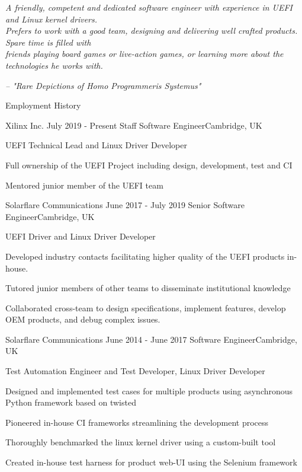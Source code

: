 \documentclass{format/resume} %
\begin{document}
{\it A friendly, competent and dedicated software engineer with experience in UEFI and Linux kernel drivers. \\
Prefers to work with a good team, designing and delivering well crafted products. Spare time is filled with \\
friends playing board games or live-action games, or learning more about the technologies he works with.}
\begin{flushright}
{\it -- "Rare Depictions of Homo Programmeris Systemus"}
\end{flushright}

\begin{rSection}{Employment History}
  \begin{rSubsection}{Xilinx Inc.}{ July 2019 - Present } {Staff Software Engineer}{Cambridge, UK}
    \item UEFI Technical Lead and Linux Driver Developer
    \item Full ownership of the UEFI Project including design, development, test and CI
    \item Mentored junior member of the UEFI team
  \end{rSubsection}

  \begin{rSubsection}{Solarflare Communications}{ June 2017 - July 2019 } {Senior Software Engineer}{Cambridge, UK}
    \item UEFI Driver and Linux Driver Developer
    \item Developed industry contacts facilitating higher quality of the UEFI products in-house.
    \item Tutored junior members of other teams to disseminate institutional knowledge
    \item Collaborated cross-team to design specifications, implement features, develop OEM products, and debug complex issues.
  \end{rSubsection}

  \begin{rSubsection}{Solarflare Communications}{ June 2014 - June 2017 } {Software Engineer}{Cambridge, UK}
    \item Test Automation Engineer and Test Developer, Linux Driver Developer
    \item Designed and implemented test cases for multiple products using asynchronous Python framework based on twisted
    \item Pioneered in-house CI frameworks streamlining the development process
    \item Thoroughly benchmarked the linux kernel driver using a custom-built tool
    \item Created in-house test harness for product web-UI using the Selenium framework
  \end{rSubsection}
\end{rSection}
\end{document}
